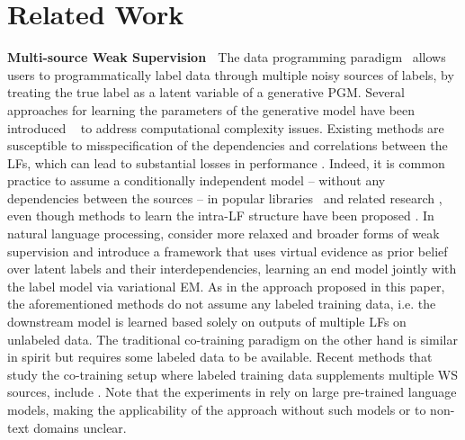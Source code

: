 \documentclass{article}
\begin{document}
\section{Related Work}
\label{RelatedWork}
\textbf{Multi-source Weak Supervision} $\;$
The data programming paradigm~\cite{DP} allows users to programmatically label data through multiple noisy sources of labels, by treating the true label as a latent variable of a generative PGM.
Several approaches for learning the parameters of the generative model have been introduced ~\cite{Multitask, triplets, TripletsMean} to address computational complexity issues. 
Existing methods are susceptible to misspecification of the dependencies and correlations between the LFs, which can lead to substantial losses in performance \cite{MisspecificationInDP}. Indeed, it is common practice to assume a conditionally independent model -- without any dependencies between the sources -- in popular libraries~\cite{Drybell, Snorkel} and related research \cite{SkeneModel, anandkumar2014tensor, Snuba, IWS}, even though methods to learn the intra-LF structure have been proposed \cite{structureLearning1, structureLearning2, SL-static-analysis}. In natural language processing,  \cite{wang2018deep} consider more relaxed and broader forms of weak supervision and introduce a framework that uses virtual evidence as prior belief over latent
labels and their interdependencies, learning an end model jointly with the label model via variational EM. 
As in the approach proposed in this paper, the aforementioned methods do not assume any labeled training data, i.e. the downstream model is learned based solely on outputs of multiple LFs on unlabeled data.
The traditional co-training paradigm \cite{co_training} on the other hand is similar in spirit but requires some labeled data to be available. Recent methods that study the co-training setup where labeled training data supplements multiple WS sources, include \cite{Awasthi2020Learning,astra}.
Note that the experiments in \cite{Awasthi2020Learning, astra} rely on large pre-trained language models, making the applicability of the approach without such models or to non-text domains unclear.
\end{document}
